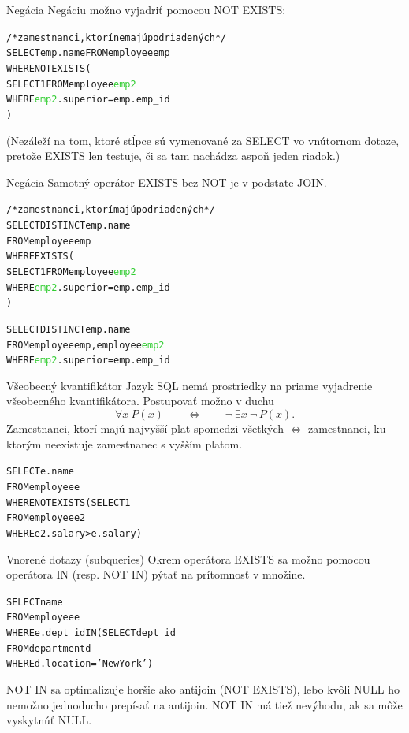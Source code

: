 \documentclass[12pt]{beamer}
\def\blue#1{\textcolor{Cerulean}{#1}}
\def\green#1{\textcolor{LimeGreen}{#1}}
\begin{document}
\begin{frame}[fragile]{Negácia}
Negáciu možno vyjadriť pomocou \alert{NOT EXISTS}:
\begin{alltt}
/* zamestnanci, ktorí nemajú podriadených */
SELECT emp.name FROM employee \blue{emp}
WHERE \alert{NOT EXISTS} (
    SELECT 1 FROM employee \green{emp2}
    WHERE \green{emp2}.superior = \blue{emp}.emp_id
)
\end{alltt}
(Nezáleží na tom, ktoré stĺpce sú vymenované za SELECT vo vnútornom dotaze, pretože EXISTS len testuje, či sa tam nachádza aspoň jeden riadok.)
\end{frame}

\begin{frame}[fragile]{Negácia}
Samotný operátor EXISTS bez NOT je v podstate JOIN.
\begin{alltt}
/* zamestnanci, ktorí majú podriadených */
SELECT DISTINCT emp.name
FROM employee \blue{emp}
WHERE \alert{EXISTS} (
    SELECT 1 FROM employee \green{emp2}
    WHERE \green{emp2}.superior = \blue{emp}.emp_id
)

SELECT DISTINCT emp.name
FROM employee \blue{emp}, employee \green{emp2}
WHERE \green{emp2}.superior = \blue{emp}.emp_id
\end{alltt}
\end{frame}

\begin{frame}[fragile]{Všeobecný kvantifikátor}
Jazyk SQL nemá prostriedky na priame vyjadrenie všeobecného kvantifikátora.
Postupovať možno v duchu
$$
    \forall x\ P(x)\qquad \Leftrightarrow\qquad \lnot\ \exists x\ \lnot\, P(x).
$$
Zamestnanci, ktorí majú najvyšší plat spomedzi \alert{všetkých} $\Leftrightarrow$ zamestnanci, ku ktorým \alert{neexistuje} zamestnanec s vyšším platom.
\begin{alltt}
SELECT e.name
FROM employee e
WHERE \blue{NOT EXISTS} (SELECT 1
                  FROM employee e2
                  WHERE e2.salary > e.salary)
\end{alltt}
\end{frame}

\begin{frame}[fragile]{Vnorené dotazy (subqueries)}
Okrem operátora EXISTS sa možno pomocou operátora IN (resp. NOT IN) pýtať na prítomnosť v množine.
\begin{alltt}
SELECT name
FROM employee e
WHERE e.dept_id \alert{IN} (SELECT dept_id
                   FROM department d
                   WHERE d.location = 'New York')
\end{alltt}
NOT IN sa optimalizuje horšie ako antijoin (NOT EXISTS), lebo kvôli NULL ho nemožno jednoducho prepísať na antijoin.
NOT IN má tiež nevýhodu, ak sa môže vyskytnúť NULL.
\end{frame}
\end{document}
